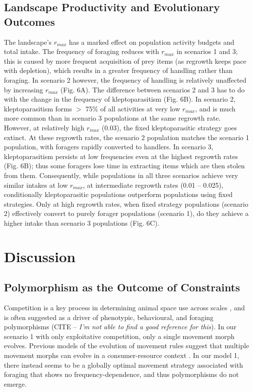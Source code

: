 \documentclass[11pt]{article}
\begin{document}
\subsection{Landscape Productivity and Evolutionary Outcomes}

The landscape's $r_{max}$ has a marked effect on population activity budgets and total intake.
The frequency of foraging reduces with $r_{max}$ in scenarios 1 and 3; this is caused by more frequent acquisition of prey items (as regrowth keeps pace with depletion), which results in a greater frequency of handling rather than foraging.
In scenario 2 however, the frequency of handling is relatively unaffected by increasing $r_{max}$ (Fig. 6A).
The difference between scenarios 2 and 3 has to do with the change in the frequency of kleptoparasitism (Fig. 6B).
In scenario 2, kleptoparasitism forms $>$ 75\% of all activities at very low $r_{max}$, and is much more common than in scenario 3 populations at the same regrowth rate.
However, at relatively high $r_{max}$ (0.03), the fixed kleptoparasitic strategy goes extinct.
At these regrowth rates, the scenario 2 population matches the scenario 1 population, with foragers rapidly converted to handlers.
In scenario 3, kleptoparasitism persists at low frequencies even at the highest regrowth rates (Fig. 6B); thus some foragers lose time in extracting items which are then stolen from them.
Consequently, while populations in all three scenarios achieve very similar intakes at low $r_{max}$, at intermediate regrowth rates (0.01 -- 0.025), conditionally kleptoparasitic populations outperform populations using fixed strategies.
Only at high regrowth rates, when fixed strategy populations (scenario 2) effectively convert to purely forager populations (scenario 1), do they achieve a higher intake than scenario 3 populations (Fig. 6C).

\section{Discussion}

\subsection{Polymorphism as the Outcome of Constraints}

Competition is a key process in determining animal space use across scales \cite{fretwell1970, vandermeer1997}, and is often suggested as a driver of phenotypic, behavioural, and foraging polymorphisms (CITE -- \textit{I'm not able to find a good reference for this}).
In our scenario 1 with only exploitative competition, only a single movement morph evolves.
Previous models of the evolution of movement rules suggest that multiple movement morphs can evolve in a consumer-resource context \citep[][Netz et al. in prep.]{getz2015}.
In our model 1, there instead seems to be a globally optimal movement strategy associated with foraging that shows no frequency-dependence, and thus polymorphisms do not emerge.
\end{document}
